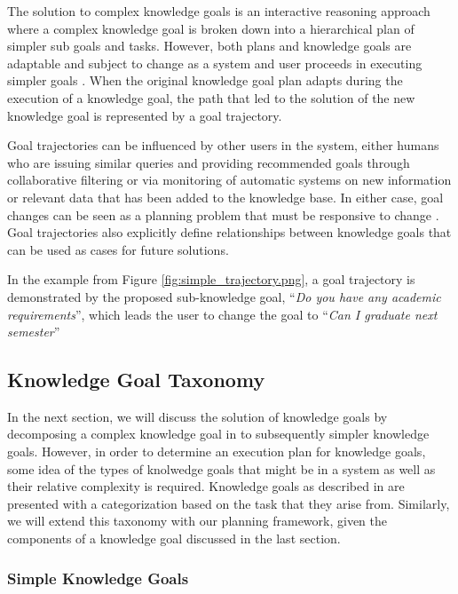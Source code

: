 \documentclass{llncs}
\begin{document}
The solution to complex knowledge goals is an interactive reasoning approach where a complex knowledge goal is broken down into a hierarchical plan of simpler sub goals and tasks. However, both plans and knowledge goals are adaptable and subject to change as a system and user proceeds in executing simpler goals \cite{munoz-avila_case-based_2008}. When the original knowledge goal plan adapts during the execution of a knowledge goal, the path that led to the solution of the new knowledge goal is represented by a goal trajectory.

Goal trajectories can be influenced by other users in the system, either humans who are issuing similar queries and providing recommended goals through collaborative filtering \cite{hayes_case-based_2001} or via monitoring of automatic systems on new information or relevant data that has been added to the knowledge base. In either case, goal changes can be seen as a planning problem that must be responsive to change \cite{cox_mixed-initiative_2007}. Goal trajectories also explicitly define relationships between knowledge goals that can be used as cases for future solutions.

In the example from Figure \ref{fig:simple_trajectory.png}, a goal trajectory is demonstrated by the proposed sub-knowledge goal, ``\textit{Do you have any academic requirements}'', which leads the user to change the goal to ``\textit{Can I graduate next semester}''

\subsection{Knowledge Goal Taxonomy}

In the next section, we will discuss the solution of knowledge goals by decomposing a complex knowledge goal in to subsequently simpler knowledge goals. However, in order to determine an execution plan for knowledge goals, some idea of the types of knolwedge goals that might be in a system as well as their relative complexity is required. Knowledge goals as described in \cite{ram_knowledge_1990,ram_goal-based_1991} are presented with a categorization based on the task that they arise from. Similarly, we will extend this taxonomy with our planning framework, given the components of a knowledge goal discussed in the last section.

\subsubsection{Simple Knowledge Goals}
\end{document}
